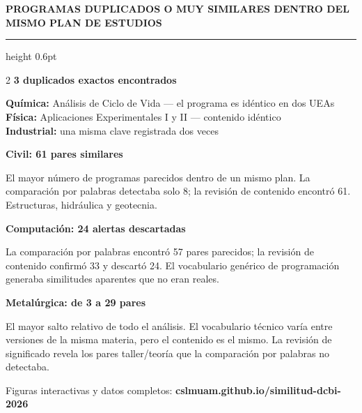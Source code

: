 \documentclass[9pt,a4paper]{article}
\newcommand{\NOTE}[1]{{\tiny\color{graymid}#1}}
\newcommand{\SECHEAD}[1]{%
  {\fontsize{6}{7}\selectfont\bfseries\color{paperbg}\MakeUppercase{#1}}%
  \par\nointerlineskip\vspace{1pt}%
  {\color{uamred}\hrule height 0.6pt}\par\vspace{3pt}}
\begin{document}
\begin{tcolorbox}[band]
\SECHEAD{programas duplicados o muy similares dentro del mismo plan de estudios}
\begin{minipage}[t]{\linewidth}
\begin{multicols}{2}
\raggedcolumns
{\footnotesize\bfseries 3 duplicados exactos encontrados}\par\vspace{2pt}
\NOTE{%
  \textbf{Química:} Análisis de Ciclo de Vida — el programa es idéntico en dos UEAs\\[1pt]
  \textbf{Física:} Aplicaciones Experimentales I y II — contenido idéntico\\[1pt]
  \textbf{Industrial:} una misma clave registrada dos veces}
\par\vspace{5pt}
{\footnotesize\bfseries Civil: 61 pares similares}\par\vspace{2pt}
\NOTE{El mayor número de programas parecidos dentro de un mismo plan.
La comparación por palabras detectaba solo 8;
la revisión de contenido encontró 61.
Estructuras, hidráulica y geotecnia.}
\columnbreak

{\footnotesize\bfseries Computación: 24 alertas descartadas}\par\vspace{2pt}
\NOTE{La comparación por palabras encontró 57 pares parecidos;
la revisión de contenido confirmó 33 y descartó 24.
El vocabulario genérico de programación
generaba similitudes aparentes que no eran reales.}
\par\vspace{5pt}
{\footnotesize\bfseries Metalúrgica: de 3 a 29 pares}\par\vspace{2pt}
\NOTE{El mayor salto relativo de todo el análisis.
El vocabulario técnico varía entre versiones de la misma materia,
pero el contenido es el mismo.
La revisión de significado revela los pares taller/teoría
que la comparación por palabras no detectaba.}
\end{multicols}
\end{minipage}
\end{tcolorbox}

\vfill

\begin{tcolorbox}[plain]
\centering
{\footnotesize\color{graymid}Figuras interactivas y datos completos:}\quad
{\footnotesize\bfseries\color{uamred}\ttfamily cslmuam.github.io/similitud-dcbi-2026}
\end{tcolorbox}
\end{document}
